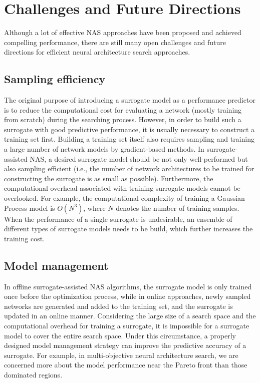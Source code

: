\documentclass[journal]{IEEEtran}
\begin{document}
\section{Challenges and Future Directions}
Although a lot of effective NAS approaches have been proposed and achieved compelling performance, there are still many open challenges and future directions for efficient neural architecture search approaches.

\subsection{Sampling efficiency}

The original purpose of introducing a surrogate model as a performance predictor is to reduce the computational cost for evaluating a network (mostly training from scratch) during the searching process. However, in order to build such a surrogate with good predictive performance, it is usually necessary to construct a training set first. Building a training set itself also requires sampling and training a large number of network models by gradient-based methods. In surrogate-assisted NAS, a desired surrogate model should be not only well-performed but also sampling efficient (i.e., the number of network architectures to be trained for constructing the surrogate is as small as possible). Furthermore, the computational overhead associated with training surrogate models cannot be overlooked. For example, the computational complexity of training a Gaussian Process model is $O(N^3)$, where $N$ denotes the number of training samples. When the performance of a single surrogate is undesirable, an ensemble of different types of surrogate models needs to be build, which further increases the training cost. 

\subsection{Model management}

In offline surrogate-assisted NAS algorithms, the surrogate model is only trained once before the optimization process, while in online approaches, newly sampled networks are generated and added to the training set, and the surrogate is updated in an online manner. Considering the large size of a search space and the computational overhead for training a surrogate, it is impossible for a surrogate model to cover the entire search space. Under this circumstance, a properly designed model management strategy can improve the predictive accuracy of a surrogate. For example, in multi-objective neural architecture search, we are concerned more about the model performance near the Pareto front than those dominated regions. 
\end{document}
